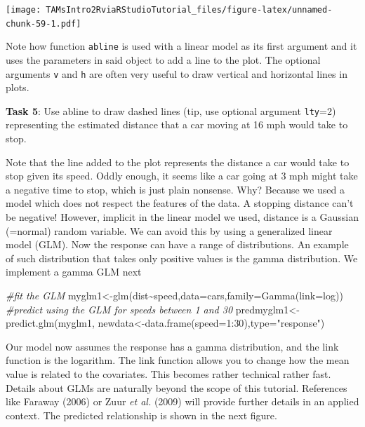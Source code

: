 \documentclass[
]{article}
\newenvironment{Shaded}{\begin{snugshade}}{\end{snugshade}}
\newcommand{\AttributeTok}[1]{\textcolor[rgb]{0.77,0.63,0.00}{#1}}
\newcommand{\CommentTok}[1]{\textcolor[rgb]{0.56,0.35,0.01}{\textit{#1}}}
\newcommand{\DecValTok}[1]{\textcolor[rgb]{0.00,0.00,0.81}{#1}}
\newcommand{\FunctionTok}[1]{\textcolor[rgb]{0.00,0.00,0.00}{#1}}
\newcommand{\NormalTok}[1]{#1}
\newcommand{\OtherTok}[1]{\textcolor[rgb]{0.56,0.35,0.01}{#1}}
\newcommand{\SpecialCharTok}[1]{\textcolor[rgb]{0.00,0.00,0.00}{#1}}
\newcommand{\StringTok}[1]{\textcolor[rgb]{0.31,0.60,0.02}{#1}}
\begin{document}
\texttt{[image: TAMsIntro2RviaRStudioTutorial\_files/figure-latex/unnamed-chunk-59-1.pdf]}

Note how function \texttt{abline} is used with a linear model as its
first argument and it uses the parameters in said object to add a line
to the plot. The optional arguments \texttt{v} and \texttt{h} are often
very useful to draw vertical and horizontal lines in plots.

\textbf{Task 5}: Use abline to draw dashed lines (tip, use optional
argument \texttt{lty}=2) representing the estimated distance that a car
moving at 16 mph would take to stop.

Note that the line added to the plot represents the distance a car would
take to stop given its speed. Oddly enough, it seems like a car going at
3 mph might take a negative time to stop, which is just plain nonsense.
Why? Because we used a model which does not respect the features of the
data. A stopping distance can't be negative! However, implicit in the
linear model we used, distance is a Gaussian (=normal) random variable.
We can avoid this by using a generalized linear model (GLM). Now the
response can have a range of distributions. An example of such
distribution that takes only positive values is the gamma distribution.
We implement a gamma GLM next

\begin{Shaded}
\begin{Highlighting}[]
\CommentTok{\#fit the GLM}
\NormalTok{myglm1}\OtherTok{\textless{}{-}}\FunctionTok{glm}\NormalTok{(dist}\SpecialCharTok{\textasciitilde{}}\NormalTok{speed,}\AttributeTok{data=}\NormalTok{cars,}\AttributeTok{family=}\FunctionTok{Gamma}\NormalTok{(}\AttributeTok{link=}\NormalTok{log))}
\CommentTok{\#predict using the GLM for speeds between 1 and 30}
\NormalTok{predmyglm1}\OtherTok{\textless{}{-}}\FunctionTok{predict.glm}\NormalTok{(myglm1,}
\NormalTok{newdata}\OtherTok{\textless{}{-}}\FunctionTok{data.frame}\NormalTok{(}\AttributeTok{speed=}\DecValTok{1}\SpecialCharTok{:}\DecValTok{30}\NormalTok{),}\AttributeTok{type=}\StringTok{"response"}\NormalTok{)}
\end{Highlighting}
\end{Shaded}

Our model now assumes the response has a gamma distribution, and the
link function is the logarithm. The link function allows you to change
how the mean value is related to the covariates. This becomes rather
technical rather fast. Details about GLMs are naturally beyond the scope
of this tutorial. References like Faraway (2006) or Zuur \emph{et al.}
(2009) will provide further details in an applied context. The predicted
relationship is shown in the next figure.
\end{document}
